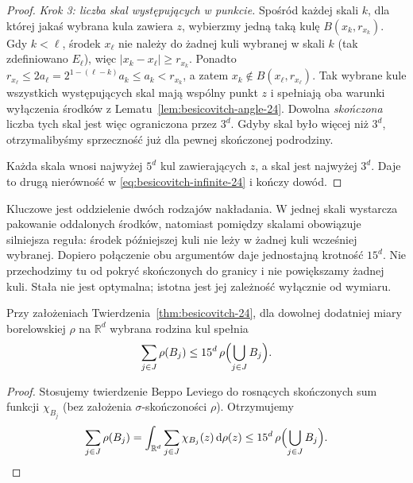 \begin{proof}
\emph{Krok 3: liczba skal występujących w punkcie.}
Spośród każdej skali $k$, dla której jakaś wybrana
kula zawiera $z$, wybierzmy jedną taką kulę
$B(x_k,r_{x_k})$. Gdy $k<\ell$, środek
$x_\ell$ nie należy do żadnej kuli wybranej w
skali $k$ (tak zdefiniowano $E_\ell$), więc
$|x_k-x_\ell|\ge r_{x_k}$. Ponadto
$r_{x_\ell}\le2a_\ell=2^{1-(\ell-k)}a_k\le a_k<r_{x_k}$,
a zatem
$x_k\notin B(x_\ell,r_{x_\ell})$.
Tak wybrane kule wszystkich występujących skal
mają wspólny punkt $z$ i spełniają oba warunki
wyłączenia środków z
Lematu~\ref{lem:besicovitch-angle-24}.
Dowolna \emph{skończona} liczba tych skal jest
więc ograniczona przez $3^d$. Gdyby skal było
więcej niż $3^d$, otrzymalibyśmy sprzeczność
już dla pewnej skończonej podrodziny.

Każda skala wnosi najwyżej $5^d$ kul
zawierających $z$, a skal jest najwyżej $3^d$.
Daje to drugą nierówność w
\eqref{eq:besicovitch-infinite-24} i kończy dowód.
\end{proof}

\begin{uwaga}
Kluczowe jest oddzielenie dwóch rodzajów nakładania.
W jednej skali wystarcza pakowanie oddalonych
środków, natomiast pomiędzy skalami obowiązuje
silniejsza reguła: środek późniejszej kuli nie leży
w żadnej kuli wcześniej wybranej. Dopiero
połączenie obu argumentów daje jednostajną
krotność $15^d$. Nie przechodzimy tu od pokryć
skończonych do granicy i nie powiększamy żadnej kuli.
Stała nie jest optymalna; istotna jest jej
zależność wyłącznie od wymiaru.
\end{uwaga}

\begin{wniosek}
\label{cor:besicovitch-measure-infinite-24}
Przy założeniach Twierdzenia~\ref{thm:besicovitch-24},
dla dowolnej dodatniej miary borelowskiej $\rho$
na $\mathbb R^d$ wybrana rodzina kul spełnia
\[
 \sum_{j\in J}\rho(B_j)
 \le15^d\,\rho\Bigl(\bigcup_{j\in J}B_j\Bigr).
\]
\end{wniosek}
\begin{proof}
Stosujemy twierdzenie Beppo Leviego do rosnących
skończonych sum funkcji $\chi_{B_j}$ (bez założenia
$\sigma$-skończoności $\rho$). Otrzymujemy
\[
 \sum_{j\in J}\rho(B_j)
 =\int_{\mathbb R^d}\sum_{j\in J}\chi_{B_j}(z)\,\mathrm d\rho(z)
 \le15^d\,\rho\Bigl(\bigcup_{j\in J}B_j\Bigr).
\]
\end{proof}

